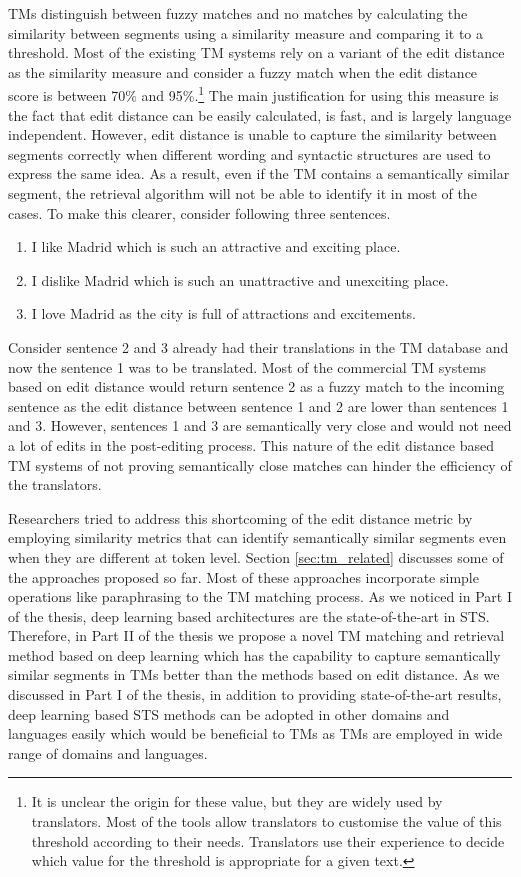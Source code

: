 TMs distinguish between fuzzy matches and no matches by calculating the similarity between segments using a similarity measure and comparing it to a threshold. Most of the existing TM systems rely on a variant of the edit distance as the similarity measure and consider a fuzzy match when the edit distance score is between 70\% and 95\%.\footnote{It is unclear the origin for these value, but they are widely used by translators. Most of the tools allow translators to customise the value of this threshold according to their needs. Translators use their experience to decide which value for the threshold is appropriate for a given text.} The main justification for using this measure is the fact that edit distance can be easily calculated, is fast, and is largely language independent. However, edit distance is unable to capture the similarity between segments correctly when different wording and syntactic structures are used to express the same idea. As a result, even if the TM contains a semantically similar segment, the retrieval algorithm will not be able to identify it in most of the cases. To make this clearer, consider following three sentences. 

\begin{enumerate}
	\item I like Madrid which is such an attractive and exciting place.
	\item I dislike Madrid which is such an unattractive and unexciting place.
	\item I love Madrid as the city is full of attractions and excitements.
\end{enumerate}


Consider sentence 2 and 3 already had their translations in the TM database and now the sentence 1 was to be translated. Most of the commercial TM systems based on edit distance would return sentence 2 as a fuzzy match to the incoming sentence as the edit distance between sentence 1 and 2 are lower than sentences 1 and 3. However, sentences 1 and 3 are semantically very close and would not need a lot of edits in the post-editing process. This nature of the edit distance based TM systems of not proving semantically close matches can hinder the efficiency of the translators. 

Researchers tried to address this shortcoming of the edit distance metric by employing similarity metrics that can identify semantically similar segments even when they are different at token level. Section \ref{sec:tm_related} discusses some of the approaches proposed so far. Most of these approaches incorporate simple operations like paraphrasing to the TM matching process. As we noticed in Part I of the thesis, deep learning based architectures are the state-of-the-art in STS. Therefore, in Part II of the thesis we propose a novel TM matching and retrieval method based on deep learning which has the capability to capture semantically similar segments in TMs better than the methods based on edit distance. As we discussed in Part I of the thesis, in addition to providing state-of-the-art results, deep learning based STS methods can be adopted in other domains and languages easily which would be beneficial to TMs as TMs are employed in wide range of domains and languages. 

